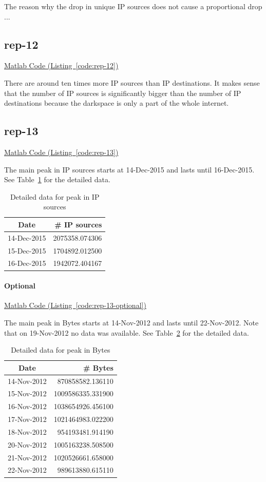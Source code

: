 \documentclass{article}
\newcommand{\codelink}[1]{%
    \hyperref[#1]{Matlab Code (Listing~\ref{#1})}%
}
\begin{document}
The reason why the drop in unique IP sources does not cause a proportional drop ...

\subsection{rep-12}

\codelink{code:rep-12}


There are around ten times more IP sources than IP destinations. It makes sense that the
number of IP sources is significantly bigger than the number of IP destinations because the
darkspace is only a part of the whole internet.

\subsection{rep-13}
\codelink{code:rep-13}

The main peak in IP sources starts at 14-Dec-2015 and lasts until 16-Dec-2015. See Table~\ref{table:rep-13}
for the detailed data.

\begin{table}[h]
    \centering
    \begin{tabular}{cr}
        Date & \# IP sources \\
        \hline
        14-Dec-2015 & 2075358.074306 \\
        15-Dec-2015 & 1704892.012500 \\
        16-Dec-2015 & 1942072.404167 \\
    \end{tabular}
    \caption{\label{table:rep-13} Detailed data for peak in IP sources}
\end{table}

\paragraph{Optional}
\codelink{code:rep-13-optional}
The main peak in Bytes starts at 14-Nov-2012 and lasts until 22-Nov-2012. Note that
on 19-Nov-2012 no data was available. See Table~\ref{table:rep-13-optional}
for the detailed data.

\begin{table}[h]
    \centering
    \begin{tabular}{cr}
        Date & \# Bytes \\
        \hline
        14-Nov-2012& 870858582.136110 \\ 
        15-Nov-2012& 1009586335.331900 \\
        16-Nov-2012& 1038654926.456100 \\
        17-Nov-2012& 1021464983.022200 \\
        18-Nov-2012& 954193481.914190 \\ 
        20-Nov-2012& 1005163238.508500 \\
        21-Nov-2012& 1020526661.658000 \\
        22-Nov-2012& 989613880.615110  \\
    \end{tabular}
    \caption{\label{table:rep-13-optional} Detailed data for peak in Bytes}
\end{table}
\end{document}
